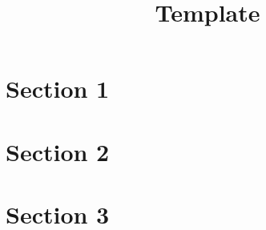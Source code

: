 \documentclass{article}
\date{}
\title{Template}
\author{}
\begin{document}
\maketitle

\section{Section 1}
\section{Section 2}
\section{Section 3}
\end{document}
